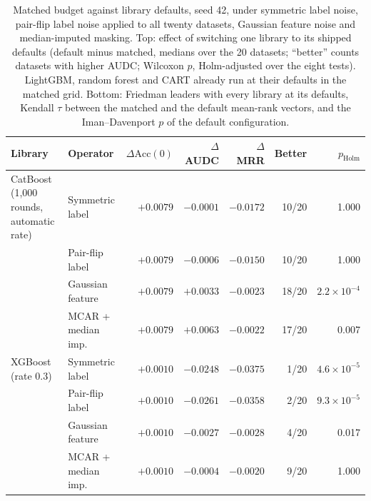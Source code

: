 \begin{table}[t]
\centering
\footnotesize
\setlength{\tabcolsep}{2.5pt}
\caption{Matched budget against library defaults, seed 42, under symmetric label noise, pair-flip label noise applied to all twenty datasets, Gaussian feature noise and median-imputed masking. Top: effect of switching one library to its shipped defaults (default minus matched, medians over the 20 datasets; ``better'' counts datasets with higher AUDC; Wilcoxon $p$, Holm-adjusted over the eight tests). LightGBM, random forest and CART already run at their defaults in the matched grid. Bottom: Friedman leaders with every library at its defaults, Kendall $\tau$ between the matched and the default mean-rank vectors, and the Iman--Davenport $p$ of the default configuration.}
\label{tab:budget}
\begin{tabular}{@{}llrrrrr@{}}
\toprule
Library & Operator & $\Delta\mathrm{Acc}(0)$ & $\Delta$AUDC & $\Delta$MRR & Better & $p_{\mathrm{Holm}}$ \\
\midrule
CatBoost (1{,}000 rounds, automatic rate) & Symmetric label & $+0.0079$ & $-0.0001$ & $-0.0172$ & 10/20 & 1.000 \\
 & Pair-flip label & $+0.0079$ & $-0.0006$ & $-0.0150$ & 10/20 & 1.000 \\
 & Gaussian feature & $+0.0079$ & $+0.0033$ & $-0.0023$ & 18/20 & $2.2\times10^{-4}$ \\
 & MCAR + median imp. & $+0.0079$ & $+0.0063$ & $-0.0022$ & 17/20 & 0.007 \\
\midrule
XGBoost (rate 0.3) & Symmetric label & $+0.0010$ & $-0.0248$ & $-0.0375$ & 1/20 & $4.6\times10^{-5}$ \\
 & Pair-flip label & $+0.0010$ & $-0.0261$ & $-0.0358$ & 2/20 & $9.3\times10^{-5}$ \\
 & Gaussian feature & $+0.0010$ & $-0.0027$ & $-0.0028$ & 4/20 & 0.017 \\
 & MCAR + median imp. & $+0.0010$ & $-0.0004$ & $-0.0020$ & 9/20 & 1.000 \\
\bottomrule
\end{tabular}


\end{table}
